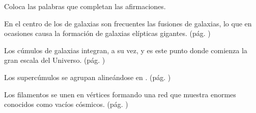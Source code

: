 Coloca las palabras que completan las afirmaciones.
\begin{parts}
    En el centro de los \fillin[cúmulos][2cm] de galaxias son frecuentes las fusiones de
    galaxias, lo que en ocasiones causa la formación de galaxias elípticas gigantes. (pág. \pageref{087b_a})

    Los cúmulos de galaxias integran, a su vez, \fillin[supercúmulos][2.5cm]
    y es este punto donde comienza la gran escala del Universo. (pág. \pageref{087b_b})

    Los supercúmulos se agrupan alineándose en \fillin[filamentos][2.5cm]. (pág. \pageref{087b_c})

    Los filamentos se unen en vértices formando una red que muestra enormes \fillin[vacios][2cm]
    conocidos como vacíos cósmicos. (pág. \pageref{087b_d})
\end{parts}